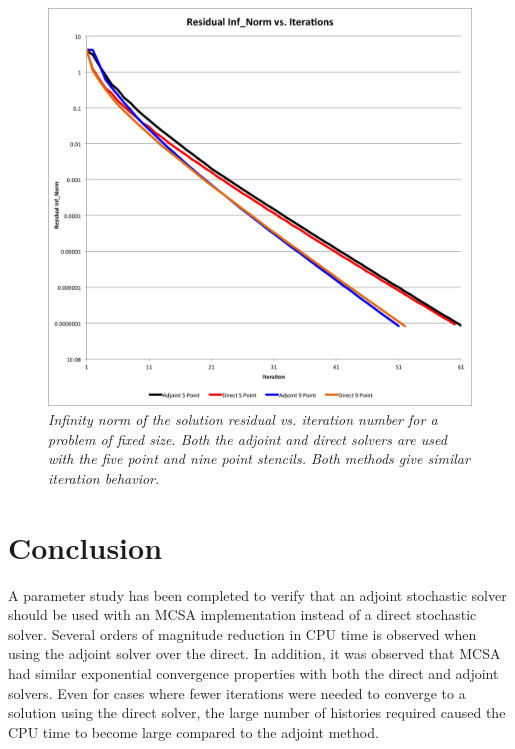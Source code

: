 \documentclass[note]{TechNote}
\begin{document}
\begin{figure}[htpb!]
  \centering
  \includegraphics[width=5in]{AdjointDirectConvergence.png}
  \caption{\sl Infinity norm of the solution residual vs. iteration
    number for a problem of fixed size. Both the adjoint and direct
    solvers are used with the five point and nine point stencils. Both
    methods give similar iteration behavior.}
  \label{fig:convergence}
\end{figure}

\section{Conclusion}
A parameter study has been completed to verify that an adjoint
stochastic solver should be used with an MCSA implementation instead
of a direct stochastic solver. Several orders of magnitude reduction
in CPU time is observed when using the adjoint solver over the
direct. In addition, it was observed that MCSA had similar exponential
convergence properties with both the direct and adjoint solvers. Even
for cases where fewer iterations were needed to converge to a solution
using the direct solver, the large number of histories required caused
the CPU time to become large compared to the adjoint method.





\closing
\caution
\end{document}
